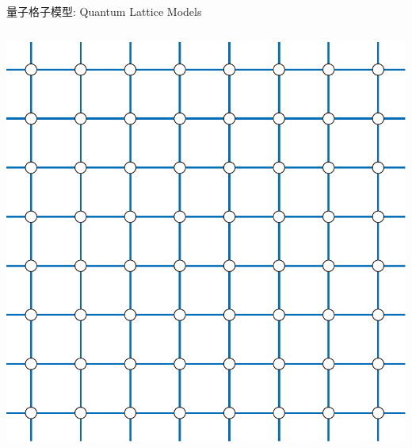 \begin{frame}{量子格子模型: Quantum Lattice Models}
\begin{columns}[T]
\begin{column}{.2\textwidth}
      \includegraphics[width=\textwidth]{square.pdf}
    \end{column}
  \end{columns}
\end{frame}

